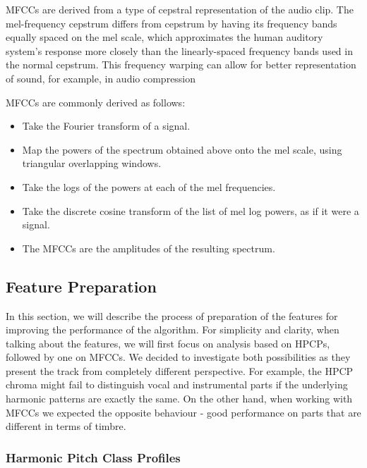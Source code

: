 MFCCs are derived from a type of cepstral representation of the audio clip. The mel-frequency cepstrum differs from cepstrum by having its frequency bands equally spaced on the mel scale, which approximates the human auditory system's response more closely than the linearly-spaced frequency bands used in the normal cepstrum. This frequency warping can allow for better representation of sound, for example, in audio compression \cite{mfcc}

MFCCs are commonly derived as follows:
\begin{itemize}
\item Take the Fourier transform of a signal.
\item Map the powers of the spectrum obtained above onto the mel scale, using triangular overlapping windows.
\item Take the logs of the powers at each of the mel frequencies.
\item Take the discrete cosine transform of the list of mel log powers, as if it were a signal.
\item The MFCCs are the amplitudes of the resulting spectrum.
\end{itemize}

\vspace{10pt}

\subsection{Feature Preparation}

In this section, we will describe the process of preparation of the features for improving the performance of the algorithm. For simplicity and clarity, when talking about the features, we will first focus on analysis based on HPCPs, followed by one on MFCCs.
We decided to investigate both possibilities as they present the track from completely different perspective. For example, the HPCP chroma might fail to distinguish vocal and instrumental parts if the underlying harmonic patterns are exactly the same. On the other hand, when working with MFCCs we expected the opposite behaviour - good performance on parts that are different in terms of timbre.

\subsubsection*{Harmonic Pitch Class Profiles}

